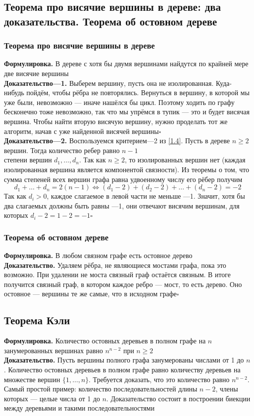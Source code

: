 \documentclass[a4paper]{article}
\begin{document}
\subsection{Теорема про висячие вершины в дереве: два доказательства. Теорема об остовном дереве}
\subsubsection*{Теорема про висячие вершины в дереве}
\textbf{Формулировка.} В дереве с хотя бы двумя вершинами найдутся по крайней мере две висячие вершины\\[2mm]
\indent\textbf{Доказательство—1.} Выберем вершину, пусть она не изолированная. Куда-нибудь пойдём, чтобы рёбра не повторялись. Вернуться в вершину, в которой мы уже были, невозможно — иначе нашёлся бы цикл. Поэтому ходить по графу бесконечно тоже невозможно, так что мы упрёмся в тупик — это и будет висячая вершина. Чтобы найти вторую висячую вершину, нужно проделать тот же алгоритм, начав с уже найденной висячей вершины\hfill$\square$\\[2mm]
\indent\textbf{Доказательство—2.} Воспользуемся критерием—2 из \ref{1.4}. Пусть в дереве $n\geqslant2$ вершин. Тогда количество ребер равно $n-1$\\[2mm]
 степени вершин $d_1,\ldots,d_n$. Так как $n\geqslant2$, то изолированных вершин нет (каждая изолированная вершина является компонентой связности). Из теоремы о том, что сумма степеней всех вершин графа равна удвоенному числу его рёбер получим $$d_1+\ldots+d_n=2(n-1)\iff(d_1-2)+(d_2-2)+\ldots+(d_n-2)=-2$$
Так как $d_i>0$, каждое слагаемое в левой части не меньше —1. Значит, хотя бы два слагаемых должны быть равны —1, они отвечают висячим вершинам, для которых $d_i-2=1-2=-1$\hfill$\square$

\subsubsection*{Теорема об остовном дереве}
\textbf{Формулировка.} В любом связном графе есть остовное дерево\\[2mm]
\indent\textbf{Доказательство.} Удаляем рёбра, не являющиеся мостами графа, пока это возможно. При удалении не моста связный граф остаётся связным. В итоге получится связный граф, в котором каждое ребро — мост, то есть дерево. Оно остовное — вершины те же самые, что в исходном графе\hfill$\square$

\subsection{Теорема Кэли}
\textbf{Формулировка.} Количество остовных деревьев в полном графе на $n$ занумерованных вершинах равно $n^{n-2}$ при $n\geqslant2$\\[2mm]
\indent\textbf{Доказательство.} Пусть вершины полного графа занумерованы числами от 1 до $n$. Количество остовных деревьев в полном графе равно количеству деревьев
на множестве вершин $\{1, \ldots, n\}$. Требуется доказать, что это количество равно $n^{n-2}$. Самый простой пример: количество последовательностей длины $n-2$, 
члены которых — целые числа от 1 до $n$. Доказательство состоит в построении биекции между деревьями и такими последовательностями
\end{document}
